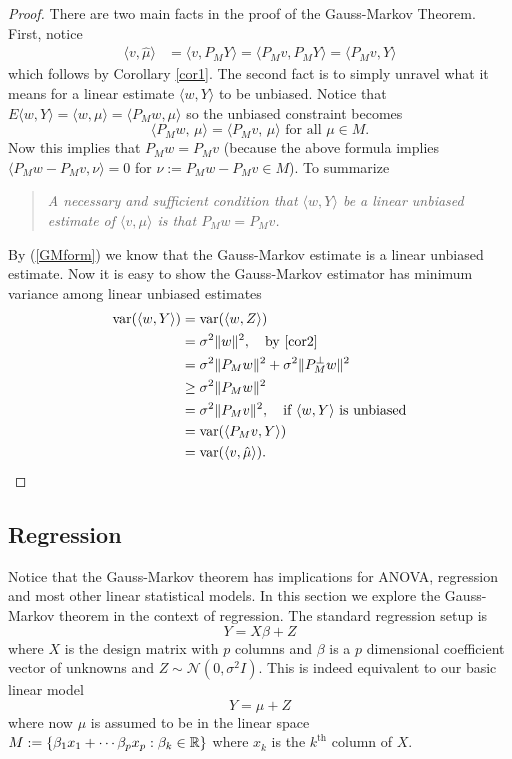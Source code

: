 \documentclass[11pt]{report}
\begin{document}
\begin{proof}
There are two main facts in the proof of the Gauss-Markov Theorem. First, notice 
\begin{align}
\langle v,\hat\mu\rangle &= \langle v,P_M Y \rangle =\langle P_Mv,P_M Y \rangle = \langle P_Mv,Y \rangle \label{GMform}
\end{align}
which follows by Corollary \ref{cor1}. 
The second fact is to simply unravel what it means for a linear estimate $\langle w,Y\rangle$  to be unbiased. Notice that $E\langle w,Y\rangle = \langle w, \mu\rangle= \langle P_M w, \mu\rangle$ so the unbiased constraint becomes
\begin{equation}
\langle P_Mw,\, \mu\rangle =  \langle P_M v,\, \mu\rangle\text{ for all $\mu\in M$}.
\end{equation} 
Now this implies that $P_Mw = P_Mv$ (because the above formula implies $\langle  P_Mw - P_Mv, \nu \rangle = 0$ for  $\nu := P_Mw - P_Mv\in M$). To summarize
\begin{quote}
\em
A necessary and sufficient condition that $\langle w, Y\rangle$ be a linear unbiased estimate of $\langle v, \mu\rangle$ is that $P_M w = P_M v$.
\end{quote}
By (\ref{GMform}) we know that the Gauss-Markov estimate is a linear unbiased estimate.
Now it is easy to show the Gauss-Markov estimator has minimum variance among linear unbiased estimates
\begin{align*}
\text{var}(\langle w, Y\rangle) &= \text{var}(\langle w, Z\rangle) \\
 &= \sigma^2\|w \|^2, \quad\text{by \ref{cor2}} \\
 &= \sigma^2\|P_Mw \|^2 + \sigma^2\|P_M^\perp w \|^2\\
 &\geq \sigma^2\|P_Mw \|^2 \\
 & = \sigma^2\|P_M v \|^2,\quad\text{if $\langle w, Y\rangle$ is unbiased} \\
 & = \text{var}(\langle P_M v, Y\rangle) \\
 & = \text{var}(\langle v, \hat\mu\rangle).
\end{align*}

\end{proof}


\subsection{Regression}
Notice that the Gauss-Markov theorem has implications for ANOVA, regression and most other linear statistical models. In this section we explore the Gauss-Markov theorem in the context of regression. The standard regression setup is 
\[
Y = X \beta + Z
\]
where $X$ is the design matrix with $p$ columns  and $\beta$ is a $p$ dimensional coefficient vector of unknowns and $Z\sim \mathcal N(0,\sigma^2 I)$. This is indeed equivalent to our basic linear model
\[Y = \mu + Z \]
where now $\mu$ is assumed to be in the linear space $M:= \{ \beta_1 x_1+\cdots \beta_p x_p:\beta_k\in \Bbb R\}$ where $x_k$ is the $k^\text{th}$ column of $X$. 
\end{document}
